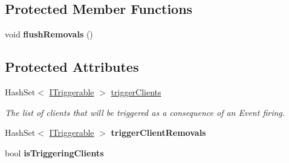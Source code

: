 \subsection*{Protected Member Functions}
\begin{DoxyCompactItemize}
\item 
\hypertarget{classstrange_1_1extensions_1_1dispatcher_1_1eventdispatcher_1_1impl_1_1_event_dispatcher_acb8980bb7635d1ffeb0e589e6200872c}{void {\bfseries flush\-Removals} ()}\label{classstrange_1_1extensions_1_1dispatcher_1_1eventdispatcher_1_1impl_1_1_event_dispatcher_acb8980bb7635d1ffeb0e589e6200872c}

\end{DoxyCompactItemize}
\subsection*{Protected Attributes}
\begin{DoxyCompactItemize}
\item 
\hypertarget{classstrange_1_1extensions_1_1dispatcher_1_1eventdispatcher_1_1impl_1_1_event_dispatcher_a4a32fe69fc92b7a3ec5609b6aae67cd8}{Hash\-Set$<$ \hyperlink{interfacestrange_1_1extensions_1_1dispatcher_1_1api_1_1_i_triggerable}{I\-Triggerable} $>$ \hyperlink{classstrange_1_1extensions_1_1dispatcher_1_1eventdispatcher_1_1impl_1_1_event_dispatcher_a4a32fe69fc92b7a3ec5609b6aae67cd8}{trigger\-Clients}}\label{classstrange_1_1extensions_1_1dispatcher_1_1eventdispatcher_1_1impl_1_1_event_dispatcher_a4a32fe69fc92b7a3ec5609b6aae67cd8}

\begin{DoxyCompactList}\small\item\em The list of clients that will be triggered as a consequence of an Event firing. \end{DoxyCompactList}\item 
\hypertarget{classstrange_1_1extensions_1_1dispatcher_1_1eventdispatcher_1_1impl_1_1_event_dispatcher_a5dd3b28d7fd2d648506ab903412bf710}{Hash\-Set$<$ \hyperlink{interfacestrange_1_1extensions_1_1dispatcher_1_1api_1_1_i_triggerable}{I\-Triggerable} $>$ {\bfseries trigger\-Client\-Removals}}\label{classstrange_1_1extensions_1_1dispatcher_1_1eventdispatcher_1_1impl_1_1_event_dispatcher_a5dd3b28d7fd2d648506ab903412bf710}

\item 
\hypertarget{classstrange_1_1extensions_1_1dispatcher_1_1eventdispatcher_1_1impl_1_1_event_dispatcher_a9cfbaaf096ecdb2555d62d992a4e6892}{bool {\bfseries is\-Triggering\-Clients}}\label{classstrange_1_1extensions_1_1dispatcher_1_1eventdispatcher_1_1impl_1_1_event_dispatcher_a9cfbaaf096ecdb2555d62d992a4e6892}

\end{DoxyCompactItemize}
